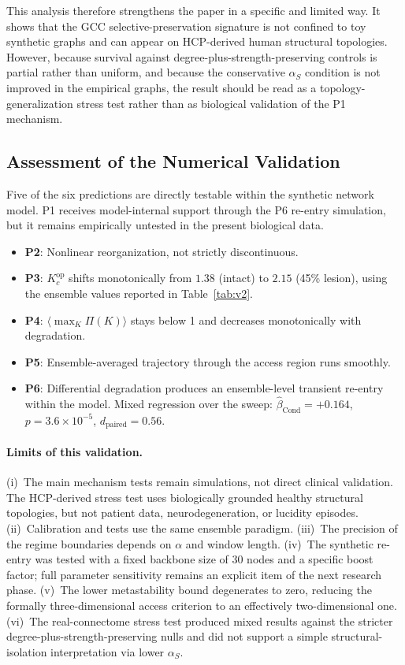 \documentclass[11pt,a4paper]{article}
\theoremstyle{plain}
\theoremstyle{definition}
\theoremstyle{remark}
\begin{document}
This analysis therefore strengthens the paper in a specific and limited way. It shows that the GCC selective-preservation signature is not confined to toy synthetic graphs and can appear on HCP-derived human structural topologies. However, because survival against degree-plus-strength-preserving controls is partial rather than uniform, and because the conservative $\alpha_S$ condition is not improved in the empirical graphs, the result should be read as a topology-generalization stress test rather than as biological validation of the P1 mechanism.

\subsection{Assessment of the Numerical Validation}

Five of the six predictions are directly testable within the synthetic network model. P1 receives model-internal support through the P6 re-entry simulation, but it remains empirically untested in the present biological data.

\begin{itemize}
  \item \textbf{P2}: Nonlinear reorganization, not strictly discontinuous.
  \item \textbf{P3}: $K_c^{\mathrm{op}}$ shifts monotonically from $1.38$ (intact) to $2.15$ (45\% lesion), using the ensemble values reported in Table~\ref{tab:v2}.
  \item \textbf{P4}: $\langle\max_K \Pi(K)\rangle$ stays below 1 and decreases monotonically with degradation.
  \item \textbf{P5}: Ensemble-averaged trajectory through the access region runs smoothly.
  \item \textbf{P6}: Differential degradation produces an ensemble-level transient re-entry within the model. Mixed regression over the sweep: $\hat{\beta}_{\mathrm{Cond}} = +0.164$, $p = 3.6 \times 10^{-5}$, $d_{\mathrm{paired}} = 0.56$.
\end{itemize}

\paragraph{Limits of this validation.} (i)~The main mechanism tests remain simulations, not direct clinical validation. The HCP-derived stress test uses biologically grounded healthy structural topologies, but not patient data, neurodegeneration, or lucidity episodes. (ii)~Calibration and tests use the same ensemble paradigm. (iii)~The precision of the regime boundaries depends on $\alpha$ and window length. (iv)~The synthetic re-entry was tested with a fixed backbone size of 30 nodes and a specific boost factor; full parameter sensitivity remains an explicit item of the next research phase. (v)~The lower metastability bound degenerates to zero, reducing the formally three-dimensional access criterion to an effectively two-dimensional one. (vi)~The real-connectome stress test produced mixed results against the stricter degree-plus-strength-preserving nulls and did not support a simple structural-isolation interpretation via lower $\alpha_S$.
\end{document}
